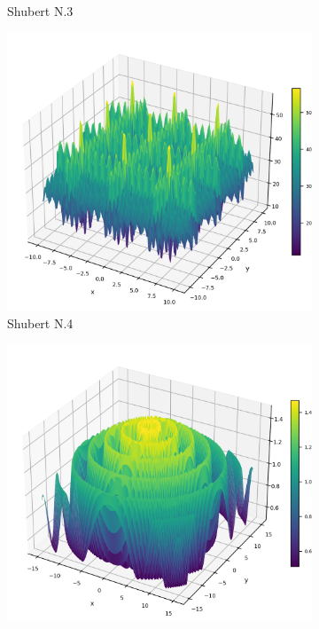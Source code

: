 \begin{figure}[p]
\begin{subfigure}{0.32\textwidth}
        \caption{Shubert N.3}
    \end{subfigure}
    \begin{subfigure}{0.32\textwidth}
        \centering
        \includegraphics[width=1\textwidth]{Figures/benchmark_plots/Shubert_N4_maximized.png}
        \caption{Shubert N.4}
    \end{subfigure}
    \begin{subfigure}{0.32\textwidth}
        \centering
        \includegraphics[width=1\textwidth]{Figures/benchmark_plots/SineEnvelope_maximized.png}

\end{subfigure}
\end{figure}
